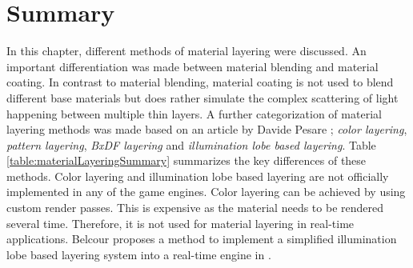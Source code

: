 \section{Summary}

In this chapter, different methods of material layering were discussed. An important differentiation was made between material blending and material coating. In contrast to material blending, material coating is not used to blend different base materials but does rather simulate the complex scattering of light happening between multiple thin layers. A further categorization of material layering methods was made based on an article by Davide Pesare \cite{pesare2017material}; \emph{color layering}, \emph{pattern layering}, \emph{BxDF layering} and \emph{illumination lobe based layering}.  
Table \ref{table:materialLayeringSummary} summarizes the key differences of these methods. Color layering and illumination lobe based layering are not officially implemented in any of the game engines. Color layering can be achieved by using custom render passes. This is expensive as the material needs to be rendered several time. Therefore, it is not used for material layering in real-time applications. Belcour proposes a method to implement a simplified illumination lobe based layering system into a real-time engine in \cite{laurent2018efficient}.

